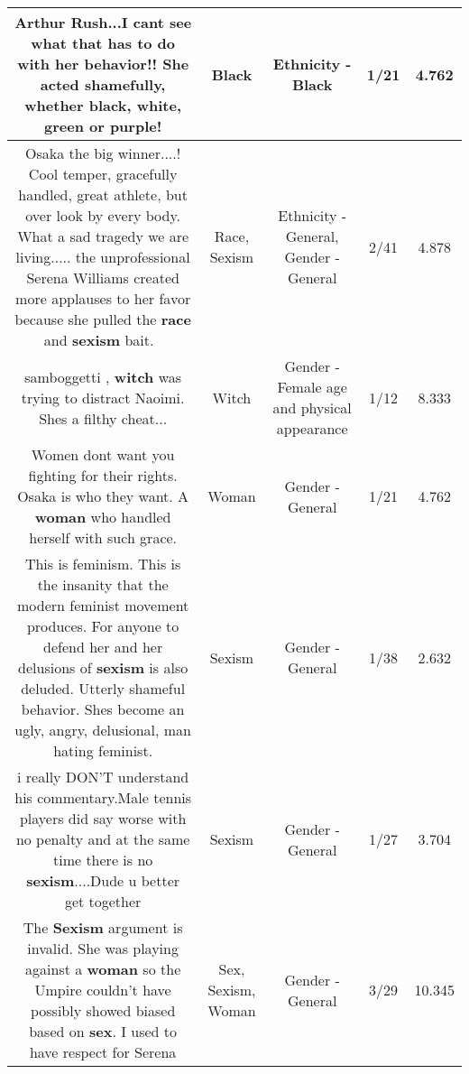 \documentclass[11pt]{article}
\newlength\mylength
\begin{document}
\begin{center}
\begin{longtable}{|C{.65\mylength}|C{.30\mylength}|C{.12\mylength}|C{.12\mylength}|C{.12\mylength}|}
  \small Arthur Rush...I cant see what that has to do with her behavior!! She acted shamefully, whether \textbf{black}, white, green or purple!\normalsize   & Black & Ethnicity - Black & 1/21 & 4.762 \\  \hline
  \small Osaka the big winner....! Cool temper, gracefully handled, great athlete, but over look by every body. What a sad tragedy we are living..... the unprofessional Serena Williams created more applauses to her favor because she pulled the \textbf{race} and \textbf{sexism} bait.👎🏾\normalsize   & Race, Sexism & Ethnicity - General, Gender - General & 2/41 & 4.878 \\  \hline
  \small samboggetti , \textbf{witch} was trying to distract Naoimi. Shes a filthy cheat...\normalsize   & Witch & Gender - Female age and physical appearance & 1/12 & 8.333 \\  \hline
  \small Women dont want you fighting for their rights. Osaka is who they want. A \textbf{woman} who handled herself with such grace.\normalsize   & Woman & Gender - General & 1/21 & 4.762 \\  \hline
  \small This is feminism. This is the insanity that the modern feminist movement produces. For anyone to defend her and her delusions of \textbf{sexism} is also deluded. Utterly shameful behavior. Shes become an ugly, angry, delusional, man hating feminist.\normalsize   & Sexism & Gender - General & 1/38 & 2.632 \\  \hline
  \small i really DON'T understand his commentary.Male tennis players did say worse with no penalty and at the same time there is no \textbf{sexism}....Dude u better get together\normalsize   & Sexism & Gender - General & 1/27 & 3.704 \\  \hline
  \small The \textbf{Sexism} argument is invalid. She was playing against a \textbf{woman} so the Umpire couldn't have possibly showed biased based on \textbf{sex}. I used to have respect for Serena\normalsize   & Sex, Sexism, Woman & Gender - General & 3/29 & 10.345 \\  \hline

\end{longtable}
\end{center}
\end{document}
